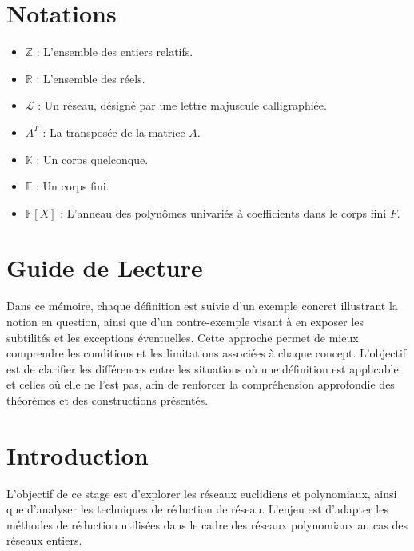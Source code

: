 \documentclass[a4paper,12pt]{report}  %
\theoremstyle{definitionstyle}
\theoremstyle{examplestyle}
\theoremstyle{remarkstyle}
\theoremstyle{propositionstyle}
\theoremstyle{theoremstyle}
\begin{document}
	
	\tableofcontents
	
	\chapter*{Notations}
	
	\begin{itemize}[label={}]
		\item $\mathbb{Z}$ : L'ensemble des entiers relatifs.
		\item $\mathbb{R}$ : L'ensemble des réels.
		\item $\mathcal{L}$ : Un réseau, désigné par une lettre majuscule calligraphiée.
		\item $A^T$ : La transposée de la matrice $A$.
		\item $\mathbb{K}$ : Un corps quelconque.
		\item $\mathbb{F}$ : Un corps fini.
		\item $\mathbb{F}[X]$ : L'anneau des polynômes univariés à coefficients dans le corps fini $F$.
	\end{itemize}
	
	
	\chapter*{Guide de Lecture}
	
	Dans ce mémoire, chaque définition est suivie d'un exemple concret illustrant la notion en question, ainsi que d'un contre-exemple visant à en exposer les subtilités et les exceptions éventuelles. Cette approche permet de mieux comprendre les conditions et les limitations associées à chaque concept. L'objectif est de clarifier les différences entre les situations où une définition est applicable et celles où elle ne l'est pas, afin de renforcer la compréhension approfondie des théorèmes et des constructions présentés.
	

	
	\chapter*{Introduction}
	
	L'objectif de ce stage est d'explorer les réseaux euclidiens et polynomiaux, ainsi que d'analyser les techniques de réduction de réseau. L'enjeu est d'adapter les méthodes de réduction utilisées dans le cadre des réseaux polynomiaux au cas des réseaux entiers.
	
\end{document}
